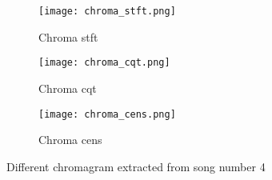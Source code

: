 \begin{figure}[h]
    \centering
    \begin{subfigure}{{\textwidth}}
    		\texttt{[image: chroma\_stft.png]}
    		\caption{Chroma stft}
    \end{subfigure}
    \begin{subfigure}{\textwidth}
    		\texttt{[image: chroma\_cqt.png]} 
    		\caption{Chroma cqt}
    \end{subfigure}
    \begin{subfigure}{\textwidth}
    		\texttt{[image: chroma\_cens.png]} 
    		\caption{Chroma cens}
    \end{subfigure}
    \caption{Different chromagram extracted from song number 4}
    \label{fig:chroma}
\end{figure}




